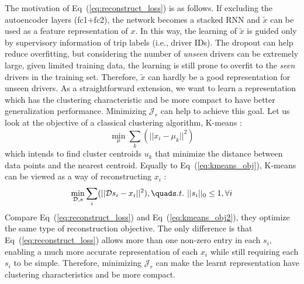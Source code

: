 \documentclass{article}
\begin{document}
The motivation of Eq~(\ref{eq:reconstruct_loss}) is as follows.
If excluding the autoencoder layers (fc1+fc2), the network becomes a stacked RNN and $\tilde{x}$ can be used as a feature representation of $x$.
In this way, the learning of $\tilde{x}$ is guided only by supervisory information of trip labels (i.e., driver IDs). The dropout can help reduce overfitting, but considering the number of \emph{unseen} drivers can be extremely large, given limited training data, the learning is still prone to overfit to the \emph{seen} drivers in the training set.
Therefore, $\tilde{x}$ can hardly be a good representation for unseen drivers.
As a straightforward extension, we want to learn a representation which has the clustering characteristic and be more compact to have better generalization performance. Minimizing $\mathcal{J}_r$ can help to achieve this goal.
Let us look at the objective of a classical clustering algorithm, K-means \cite{kmeans2012learningfeature}:
\begin{equation}\label{eq:kmeans_obj}
\min_{\mu} \sum_k  (|| x_i - \mu_k ||^2)
\end{equation}
which intends to find cluster centroids $u_k$ that minimize the distance between data points and the nearest centroid.
Equally to Eq~(\ref{eq:kmeans_obj}), K-means can be viewed as a way of reconstructing $x_i$ \cite{kmeans2012learningfeature}:
\begin{align}\label{eq:kmeans_obj2}
\min_{\mathcal{D},s} \sum_i(|| \mathcal{D}s_i - x_i ||^2), \quad%
s.t. \hspace{0.05in}  || s_i||_0 \leq 1, \forall i
\end{align}
Compare Eq~(\ref{eq:reconstruct_loss}) and Eq~(\ref{eq:kmeans_obj2}), they optimize the same type of reconstruction objective. The only difference is that Eq~(\ref{eq:reconstruct_loss}) allows more than one non-zero entry in each $s_i$, enabling a much more accurate representation of each $x_i$ while still requiring each $s_i$ to be simple.
Therefore, minimizing $\mathcal{J}_r$ can make the learnt representation have clustering characteristics and be more compact. %
\end{document}
